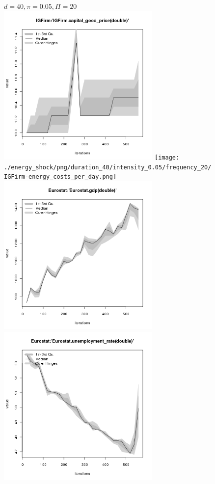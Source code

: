 \begin{figure}[ht!]
\centering\leavevmode
\begin{minipage}{17cm}
\centering\leavevmode
{$d=40, \pi=0.05, \Pi=20$}\\
\includegraphics[width=8cm]{./energy_shock/png/duration_40/intensity_0.05/frequency_20/IGFirm-capital_good_price.png}
\texttt{[image: ./energy\_shock/png/duration\_40/intensity\_0.05/frequency\_20/IGFirm-energy\_costs\_per\_day.png]}
\includegraphics[width=8cm]{./energy_shock/png/duration_40/intensity_0.05/frequency_20/Eurostat-gdp.png}
\includegraphics[width=8cm]{./energy_shock/png/duration_40/intensity_0.05/frequency_20/Eurostat-unemployment_rate.png}
\end{minipage}
\end{figure}

